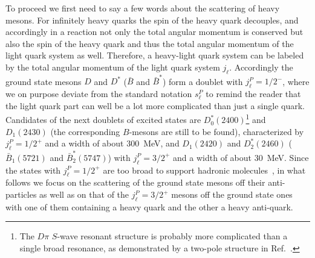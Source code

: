 To proceed we first need to say a few words about the scattering of heavy
mesons.
For infinitely heavy quarks the spin of the heavy quark decouples, and
accordingly in a reaction not only the total angular momentum is conserved but
also the spin of the heavy quark and thus the total angular momentum of the
light quark system as well. Therefore, a heavy-light quark system can be labeled
by the total angular momentum of the light quark system $j_\ell$. Accordingly
the ground state mesons $D$ and $D^*$  ($\bar B$ and $\bar B^*$) form a doublet
with $j^P_{\ell}=1/2^-$, where we on purpose deviate from the standard notation
$s_\ell^P$ to remind the reader that the light quark part can well be a lot more
complicated than just a single quark.
Candidates of the next doublets of excited states are $D^*_0(2400)$\footnote{The
$D\pi$ $S$-wave resonant structure is probably more complicated than a single
broad resonance, as demonstrated by a two-pole structure in
Ref.~\cite{Albaladejo:2016lbb}.} and $D_1(2430)$ (the corresponding $B$-mesons
are still to be found), characterized by $j^P_{\ell}=1/2^+$ and a width of about
300~MeV, and $D_1(2420)$ and $D_2^*(2460)$ ($\bar B_1(5721)$ and $\bar
B^*_2(5747)$) with $j^P_{\ell}=3/2^+$ and a width of about 30~MeV. Since the
states with $j^P_{\ell}=1/2^+$ are too broad to support hadronic
molecules~\cite{Filin:2010se,Guo:2011dd}, in what follows we  focus on the
scattering of the ground state mesons off their anti-particles as well as on
that of the $j^P_{\ell}=3/2^+$ mesons off the ground state ones with one of them
containing a heavy quark and the other a heavy anti-quark.


